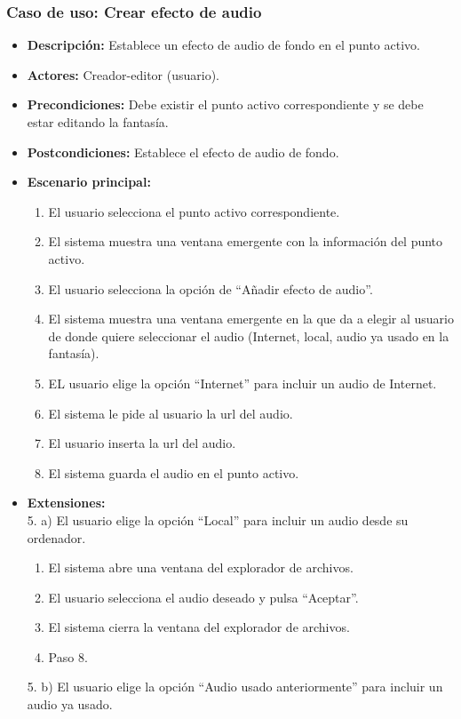 \subsubsection{Caso de uso: Crear efecto de audio}
\begin{itemize}
	\item \textbf{Descripción:} Establece un efecto de audio de fondo en el punto activo.
	\item \textbf{Actores:} Creador-editor (usuario).
	\item \textbf{Precondiciones:} Debe existir el punto activo correspondiente y se debe estar editando la fantasía.
	\item \textbf{Postcondiciones:} Establece el efecto de audio de fondo.
	\item \textbf{Escenario principal:}
	\begin{enumerate}
		\item El usuario selecciona el punto activo correspondiente.
		\item El sistema muestra una ventana emergente con la información del punto activo.
		\item El usuario selecciona la opción de ``Añadir efecto de audio''.
		\item El sistema muestra una ventana emergente en la que da a elegir al usuario de donde quiere seleccionar el audio (Internet, local, audio ya usado en la fantasía).
		\item EL usuario elige la opción ``Internet'' para incluir un audio de Internet.
		\item El sistema le pide al usuario la url del audio.
		\item El usuario inserta la url del audio.
		\item El sistema guarda el audio en el punto activo.
	\end{enumerate}
	\item \textbf{Extensiones:} \\ 5. a) El usuario elige la opción ``Local'' para incluir un audio desde su ordenador.
	\begin{enumerate}
		\item El sistema abre una ventana del explorador de archivos.
		\item El usuario selecciona el audio deseado y pulsa ``Aceptar''.
		\item El sistema cierra la ventana del explorador de archivos.
		\item Paso 8.
	\end{enumerate}
	5. b) El usuario elige la opción ``Audio usado anteriormente'' para incluir un audio ya usado.

\end{itemize}
